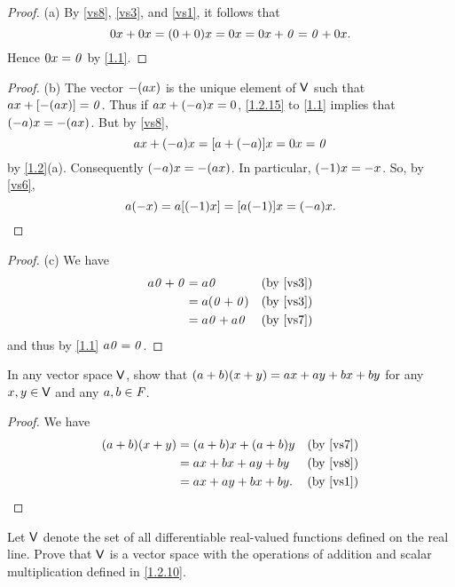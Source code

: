 \begin{proof}{(a)}
  By \ref{vs8}, \ref{vs3}, and \ref{vs1}, it follows that
  \[
    0x + 0x = \p{0 + 0} x = 0x = 0x + \zv = \zv + 0x.
  \]
  Hence \(0x = \mathit{0}\) by \cref{1.1}.
\end{proof}

\begin{proof}{(b)}
  The vector \(-\p{ax}\) is the unique element of \(\mathsf{V}\) such that \(ax + \bk{-\p{ax}} = \zv\).
  Thus if \(ax + \p{-a}x = 0\), \cref{1.2.15} to \cref{1.1} implies that \(\p{-a}x = -\p{ax}\).
  But by \ref{vs8},
  \[
    ax + \p{-a}x = \bk{a + \p{-a}}x = 0x = \zv
  \]
  by \cref{1.2}(a).
  Consequently \(\p{-a}x = -\p{ax}\).
  In particular, \(\p{-1}x = -x\).
  So, by \ref{vs6},
  \[
    a\p{-x} = a\bk{\p{-1}x} = \bk{a\p{-1}}x = \p{-a}x.
  \]
\end{proof}

\begin{proof}{(c)}
  We have
  \begin{align*}
    a\zv + \zv & = a\zv           &  & \text{(by \ref{vs3})} \\
               & = a\p{\zv + \zv} &  & \text{(by \ref{vs3})} \\
               & = a\zv + a\zv    &  & \text{(by \ref{vs7})}
  \end{align*}
  and thus by \cref{1.1} \(a\mathit{0} = \mathit{0}\).
\end{proof}

\exercisesection

\setcounter{ex}{7}
\begin{ex}\label{ex:1.2.8}
  In any vector space \(\mathsf{V}\), show that \(\p{a + b}\p{x + y} = ax + ay + bx + by\) for any \(x, y \in \mathsf{V}\) and any \(a, b \in \mathit{F}\).
\end{ex}

\begin{proof}
  We have
  \begin{align*}
    \p{a + b}\p{x + y} & = \p{a + b} x + \p{a + b} y &  & \text{(by \ref{vs7})} \\
                       & = ax + bx + ay + by         &  & \text{(by \ref{vs8})} \\
                       & = ax + ay + bx + by.        &  & \text{(by \ref{vs1})}
  \end{align*}
\end{proof}

\setcounter{ex}{9}
\begin{ex}\label{ex:1.2.10}
  Let \(\mathsf{V}\) denote the set of all differentiable real-valued functions defined on the real line.
  Prove that \(\mathsf{V}\) is a vector space with the operations of addition and scalar multiplication defined in \cref{1.2.10}.
\end{ex}

